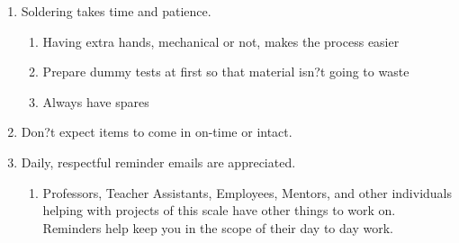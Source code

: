 \documentclass{article}
\begin{document}
\begin{enumerate}
\begin{enumerate}
\end{enumerate}
\item Soldering takes time and patience.
\begin{enumerate}
\item Having extra hands, mechanical or not, makes the process easier
\item Prepare dummy tests at first so that material isn?t going to waste
\item Always have spares
\end{enumerate}
\item Don?t expect items to come in on-time or intact. 
\item Daily, respectful reminder emails are appreciated.
\begin{enumerate}
\item Professors, Teacher Assistants, Employees, Mentors, and other individuals helping with projects of this scale have other things to work on. Reminders help keep you in the scope of their day to day work.
\end{enumerate}
\end{enumerate}

\end{document}
